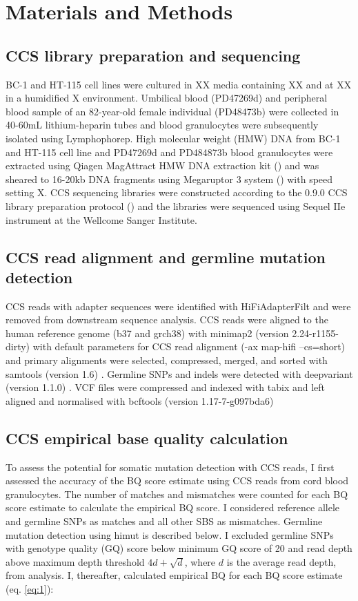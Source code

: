\section{Materials and Methods}

\subsection{CCS library preparation and sequencing}

BC-1 and HT-115 cell lines were cultured in XX media containing XX and at XX in a humidified X environment. Umbilical blood (PD47269d) and peripheral blood sample of an 82-year-old female individual (PD48473b) were collected in 40-60mL lithium-heparin tubes and blood granulocytes were subsequently isolated using Lymphophorep. High molecular weight (HMW) DNA from BC-1 and HT-115 cell line and PD47269d and PD484873b blood granulocytes were extracted using Qiagen MagAttract HMW DNA extraction kit () and was sheared to 16-20kb DNA fragments using Megaruptor 3 system () with speed setting X. CCS sequencing libraries were constructed according to the 0.9.0 CCS library preparation protocol () and the libraries were sequenced using Sequel IIe instrument at the Wellcome Sanger Institute. 

\subsection{CCS read alignment and germline mutation detection}
CCS reads with adapter sequences were identified with HiFiAdapterFilt \cite{Sim2022-pi} and were removed from downstream sequence analysis. CCS reads were aligned to the human reference genome (b37 and grch38) with minimap2 (version 2.24-r1155-dirty) with default parameters for CCS read alignment (-ax map-hifi --cs=short) \cite{Li2018-am} and primary alignments were selected, compressed, merged, and sorted with samtools (version 1.6) \cite{Li2009-qp}. Germline SNPs and indels were detected with deepvariant (version 1.1.0) \cite{Poplin2018-ub}. VCF files were compressed and indexed with tabix \cite{Li2011-zj} and left aligned and normalised with bcftools (version 1.17-7-g097bda6) \cite{Li2011-ag}

\subsection{CCS empirical base quality calculation}

To assess the potential for somatic mutation detection with CCS reads, I first assessed the accuracy of the BQ score estimate using CCS reads from cord blood granulocytes. The number of matches and mismatches were counted for each BQ score estimate to calculate the empirical BQ score. I considered reference allele and germline SNPs as matches and all other SBS as mismatches. Germline mutation detection using himut is described below. I excluded germline SNPs with genotype quality (GQ) score below minimum GQ score of 20 and read depth above maximum depth threshold $4d + \sqrt{d}$, where $d$ is the average read depth, from analysis. I, thereafter, calculated empirical BQ for each BQ score estimate (eq. \ref{eq:1}): 

